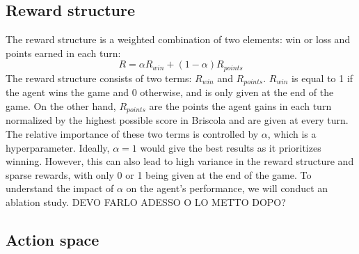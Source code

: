 \subsection{Reward structure}
The reward structure is a weighted combination of two elements: win or loss and points earned in each turn:
\begin{equation}
    R = \alpha R_{win} + (1 - \alpha) R_{points}
    \label{eq:reward-structure}
\end{equation}
The reward structure consists of two terms: $R_{win}$ and $R_{points}$. $R_{win}$ is equal to 1 if the agent wins the game and 0 otherwise, and is only given at the end of the game. On the other hand, $R_{points}$ are the points the agent gains in each turn normalized by the highest possible score in Briscola and are given at every turn. The relative importance of these two terms is controlled by $\alpha$, which is a hyperparameter. Ideally, $\alpha=1$ would give the best results as it prioritizes winning. However, this can also lead to high variance in the reward structure and sparse rewards, with only 0 or 1 being given at the end of the game. To understand the impact of $\alpha$ on the agent's performance, we will conduct an ablation study. DEVO FARLO ADESSO O LO METTO DOPO?

\subsection{Action space}

